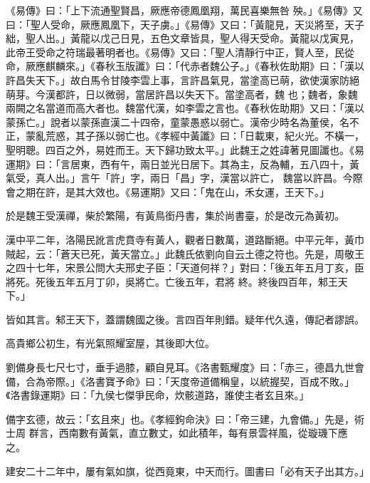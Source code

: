 \begin{pinyinscope}
 《易傳》曰：「上下流通聖賢昌，厥應帝德鳳凰翔，萬民喜樂無咎
 殃。」《易傳》又曰：「聖人受命，厥應鳳凰下，天子虜。」《易傳》又曰：「黃龍見，天災將至，天子絀，聖人出。」黃龍以戊己日見，五色文章皆具，聖人得天受命。黃龍以戊寅見，此帝王受命之符瑞最著明者也。《易傳》又曰：「聖人清靜行中正，賢人至，民從命，厥應麒麟來。」《春秋玉版讖》曰：「代赤者魏公子。」《春秋佐助期》曰：「漢以許昌失天下。」故白馬令甘陵李雲上事，言許昌氣見，當塗高已萌，欲使漢家防絕萌芽。今漢都許，日以微弱，當居許昌以失天下。當塗高者，魏
 也；魏者，象魏兩闕之名當道而高大者也。魏當代漢，如李雲之言也。《春秋佐助期》又曰：「漢以蒙孫亡。」說者以蒙孫直漢二十四帝，童蒙愚惑以弱亡。漢帝少時名為董侯，名不正，蒙亂荒惑，其子孫以弱亡也。《孝經中黃讖》曰：「日載東，紀火光。不橫一，聖明聰。四百之外，易姓而王。天下歸功致太平。」此魏王之姓諱著見圖讖也。《易運期》曰：「言居東，西有午，兩日並光日居下。其為主，反為輔，五八四十，黃氣受，真人出。」言午「許」字，兩日「昌」字，漢當以許亡，
 魏當以許昌。今際會之期在許，是其大效也。《易運期》又曰：「鬼在山，禾女運，王天下。」



 於是魏王受漢禪，柴於繁陽，有黃鳥銜丹書，集於尚書臺，於是改元為黃初。



 漢中平二年，洛陽民訛言虎賁寺有黃人，觀者日數萬，道路斷絕。中平元年，黃巾賊起，云：「蒼天已死，黃天當立。」此魏氏依劉向自云土德之符也。先是，周敬王之四十七年，宋景公問大夫邢史子臣：「天道何祥？」對曰：「後五年五月丁亥，臣將死。死後五年五月丁卯，吳將亡。亡後五年，君將
 終。終後四百年，邾王天下。」



 皆如其言。邾王天下，蓋謂魏國之後。言四百年則錯。疑年代久遠，傳記者謬誤。



 高貴鄉公初生，有光氣照耀室屋，其後即大位。



 劉備身長七尺七寸，垂手過膝，顧自見耳。《洛書甄耀度》曰：「赤三，德昌九世會備，合為帝際。」《洛書寶予命》曰：「天度帝道備稱皇，以統握契，百成不敗。」《洛書錄運期》曰：「九侯七傑爭民命，炊骸道路，誰使主者玄且來。」



 備字玄德，故云：「玄且來」也。《孝經鉤命決》曰：「帝三建，九會備。」先是，術士周
 群言，西南數有黃氣，直立數丈，如此積年，每有景雲祥風，從璇璣下應之。



 建安二十二年中，屢有氣如旗，從西竟東，中天而行。圖書曰「必有天子出其方。」




\end{pinyinscope}
